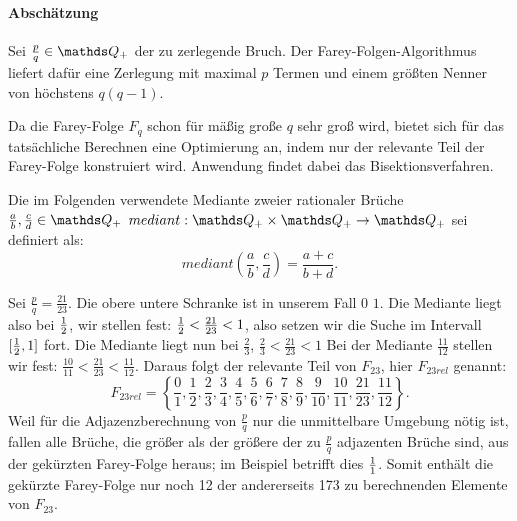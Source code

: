 \paragraph{Abschätzung}Sei $\frac{p}{q} \in \Q_+$ der zu zerlegende Bruch. Der Farey-Folgen-Algorithmus liefert dafür eine Zerlegung mit maximal $p$ Termen und einem größten Nenner von höchstens $q(q-1)$. \cite[S.343]{Bleicher1972}

Da die Farey-Folge $F_q$ schon für mäßig große $q$ sehr groß wird, bietet sich für das tatsächliche Berechnen eine Optimierung an, indem nur der relevante Teil der Farey-Folge konstruiert wird. Anwendung findet dabei das Bisektionsverfahren.
\begin{def1}\label{def:mediant}
	Die im Folgenden verwendete Mediante zweier rationaler Brüche $\frac{a}{b}, \frac{c}{d} \in \Q_+$ $mediant: \Q_+ \times \Q_+ \rightarrow \Q_+$ sei definiert als:
	$$mediant \left(\frac{a}{b}, \frac{c}{d}\right) = \frac{a+c}{b+d}.$$
\end{def1}
\begin{bsp}\label{bsp:Frel}
	Sei $\frac{p}{q} = \frac{21}{23}$. Die obere \bzw untere Schranke ist in unserem Fall $0$ \bzw $1$. Die Mediante liegt also bei $\frac{1}{2}$, wir stellen fest: $\frac{1}{2}<\frac{21}{23}<1$, also setzen wir die Suche im Intervall $[\frac{1}{2}, 1]$ fort. Die Mediante liegt nun bei $\frac{2}{3}$, $\frac{2}{3}<\frac{21}{23}<1$ \usw
	Bei der Mediante $\frac{11}{12}$ stellen wir fest: $\frac{10}{11} < \frac{21}{23} < \frac{11}{12}.$ Daraus folgt der relevante Teil von $F_{23}$, hier $F_{23rel}$ genannt: $$F_{23rel} = \left\{\frac{0}{1}, \frac{1}{2}, \frac{2}{3}, \frac{3}{4}, \frac{4}{5}, \frac{5}{6}, \frac{6}{7}, \frac{7}{8}, \frac{8}{9}, \frac{9}{10}, \frac{10}{11}, \frac{21}{23}, \frac{11}{12}\right\}.$$
	Weil für die Adjazenzberechnung von $\frac{p}{q}$ nur die unmittelbare Umgebung nötig ist, fallen alle Brüche, die größer als der größere der zu $\frac{p}{q}$ adjazenten Brüche sind, aus der gekürzten Farey-Folge heraus; im Beispiel betrifft dies $\frac{1}{1}$.
	Somit enthält die gekürzte Farey-Folge nur noch 12 der andererseits 173 zu berechnenden Elemente von $F_{23}$.
\end{bsp}